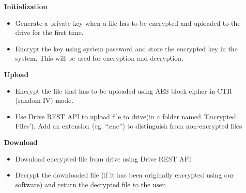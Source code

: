 \documentclass[a4paper]{article}
\begin{document}
\textbf{Initialization}
\begin{itemize}
\vspace{-2mm}
\item Generate a private key when a file has to be encrypted and uploaded to the drive for the first time. 
\item Encrypt the key using system password and store the encrypted key in the system. This will be used for encryption and decryption. \\
\end{itemize}
\vspace{-5mm}
\noindent \textbf{Upload} 
\begin{itemize}\vspace{-2mm}
\item
Encrypt the file that has to be uploaded using AES block cipher in CTR (random IV) mode.
\item Use Drive REST API to upload file to drive(in a folder named 'Encrypted Files'). Add an extension (eg. “.enc”) to distinguish from non-encrypted files \\
\end{itemize}
\vspace{-5mm}
\noindent \textbf{Download}
\begin{itemize}\vspace{-2mm}

\item Download encrypted file from drive using Drive REST API
\item Decrypt the downloaded file (if it has been originally encrypted using our software) and return the decrypted file to the user. \\
\end{itemize}
\end{document}
